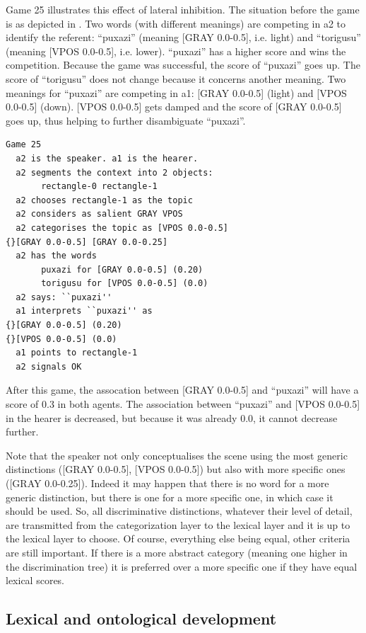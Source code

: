 Game 25 illustrates this effect of 
lateral inhibition. The situation before the game is 
as depicted in . 
Two words (with different meanings) are competing in {\bfshape  a2} to 
identify the referent: ``puxazi'' (meaning 
{}[GRAY 0.0-0.5], i.e. light) and ``torigusu''
(meaning [VPOS 0.0-0.5], i.e. lower).  ``puxazi'' has
a higher score and wins the competition. Because the game 
was successful, the score
of ``puxazi'' goes up. The score of ``torigusu'' 
does not change because it concerns another 
meaning. Two meanings for ``puxazi''
are competing in {\bfshape  a1}: [GRAY 0.0-0.5] (light)
and [VPOS 0.0-0.5] (down). [VPOS 0.0-0.5] gets damped and 
the score of [GRAY 0.0-0.5] goes up, thus helping to 
further disambiguate ``puxazi''. 
\begin{verbatim}
Game 25
  a2 is the speaker. a1 is the hearer. 
  a2 segments the context into 2 objects: 
       rectangle-0 rectangle-1 
  a2 chooses rectangle-1 as the topic 
  a2 considers as salient GRAY VPOS
  a2 categorises the topic as [VPOS 0.0-0.5] 
{}[GRAY 0.0-0.5] [GRAY 0.0-0.25]
  a2 has the words
       puxazi for [GRAY 0.0-0.5] (0.20)
       torigusu for [VPOS 0.0-0.5] (0.0)
  a2 says: ``puxazi''
  a1 interprets ``puxazi'' as
{}[GRAY 0.0-0.5] (0.20)
{}[VPOS 0.0-0.5] (0.0)
  a1 points to rectangle-1
  a2 signals OK
\end{verbatim}
After this game, the assocation between [GRAY 0.0-0.5] 
and ``puxazi'' will have a score of 0.3 in both agents. 
The association between ``puxazi'' and [VPOS 0.0-0.5] 
in the hearer is decreased, but because it was already 
0.0, it cannot decrease further. 

Note that the speaker not only conceptualises the scene using 
the most generic distinctions ([GRAY 0.0-0.5], 
{}[VPOS 0.0-0.5]) but also
with more specific ones ([GRAY 0.0-0.25]). Indeed it 
may happen that there is no word for a more generic 
distinction, but there is one for a more specific 
one, in which case it should be used. 
So, all discriminative distinctions, 
whatever their level of detail, are
transmitted from the categorization layer to the 
lexical layer and it is up to the lexical layer
to choose. Of course, everything else being equal, 
other criteria are still important. If there is a 
more abstract category (meaning one higher in the 
discrimination tree) it is preferred over a more 
specific one if they have equal lexical scores. 

\subsection{Lexical and ontological development} 

